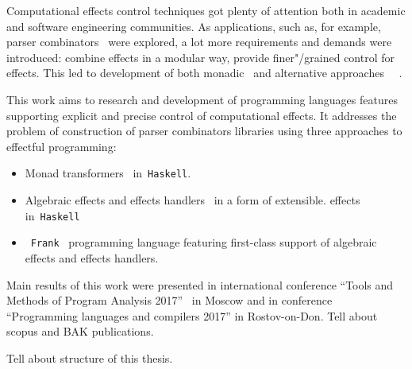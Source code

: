 Computational effects control techniques got plenty of attention both in academic and software engineering communities. As applications, such as, for example, parser combinators~\cite{monParsing} were explored, a lot more requirements and demands
were introduced: combine effects in a modular way, provide finer"/grained control
for effects. This led to development of both monadic~\cite{Liang:1995:MTM:199448.199528} and alternative approaches~\cite{Mcbride:2008:APE:1348940.1348941}
~\cite{DBLP:journals/jlp/BauerP15}.

This work aims to research and development of programming languages features supporting explicit and precise control of computational effects. It addresses the problem
of construction of parser combinators libraries using three approaches to
effectful programming:

\begin{itemize}
  \item Monad transformers~\cite{Liang:1995:MTM:199448.199528} in~\texttt{Haskell}.
  \item Algebraic effects and effects handlers~\cite{DBLP:journals/jlp/BauerP15}
  in a form of extensible.
  effects~\cite{Kiselyov:2013:EEA:2578854.2503791} in~\texttt{Haskell}
  \item~\texttt{Frank}~\cite{DBLP:conf/popl/LindleyMM17} programming language featuring first-class support of algebraic
  effects and effects handlers.
\end{itemize}

Main results of this work were presented in  international conference ``Tools and Methods of Program Analysis 2017''~\cite{tmpa} in Moscow and in conference
``Programming languages and compilers 2017'' in Rostov-on-Don.
Tell about scopus and BAK publications.

Tell about structure of this thesis.

